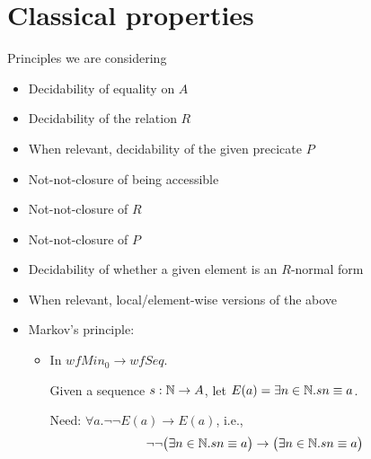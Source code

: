 \documentclass{scrartcl}
\begin{document}
\section{Classical properties}
Principles we are considering
\begin{itemize}
  \item Decidability of equality on $A$
  \item Decidability of the relation $R$
  \item When relevant, decidability of the given precicate $P$
  \item Not-not-closure of being accessible
  \item Not-not-closure of $R$
  \item Not-not-closure of $P$
  \item Decidability of whether a given element is an $R$-normal form
  \item When relevant, local/element-wise versions of the above
  \item Markov's principle:
  \begin{itemize}
    \item In $wfMin_0 \to wfSeq$.

    Given a sequence $s : \mathbb{N} \to A$, let $E(a) = \exists n \in \mathbb{N}. s n \equiv a$.

    Need: $\forall a. \lnot\lnot E(a) \to E(a)$, i.e.,
    \[\lnot\lnot \big(\exists n \in \mathbb{N}. s n \equiv a\big)
          \to \big(\exists n \in \mathbb{N}. s n \equiv a\big)\]

  \end{itemize}
\end{itemize}
\newpage
\end{document}
